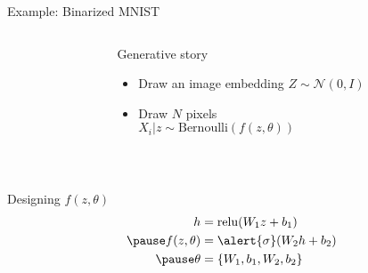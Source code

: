 \documentclass[14pt, aspectratio=169]{beamer}
\begin{document}
\begin{frame}{Example: Binarized MNIST}


\begin{columns}
	\begin{column}{0.2\textwidth}
    \end{column}
    \begin{column}{0.75\textwidth}
    	Generative story 
    	\begin{itemize}
			\item Draw an image embedding $Z \sim \mathcal N(0, I)$
			\item Draw $N$ pixels\\
			$X_i|z \sim \text{Bernoulli}(f(z, \theta))$
		\end{itemize}
    \end{column}
    \end{columns}
    \pause
    
    ~
    
    Designing $f(z, \theta)$    \pause
    \begin{equation*}
	\begin{aligned}						
		h &= \relu(W_1z+b_1) \\ \pause
		f(z, \theta) &= \alert{\sigma}(W_2h + b_2) \\		\pause
		\theta &= \{W_1, b_1, W_2, b_2\}
	\end{aligned}
	\end{equation*}
	

\end{frame}
\end{document}
